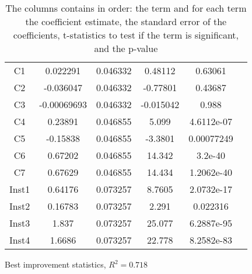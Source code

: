\documentclass[../main.tex]{subfiles}
\begin{document}
\begin{table}
\begin{adjustbox}{width=\columnwidth,center}
\begin{subtable}{.75\columnwidth}
\begin{tabular}{cccccc}
            C1      & 0.022291  & 0.046332      & 0.48112   & 0.63061   \\
            C2      & -0.036047 & 0.046332      & -0.77801  & 0.43687   \\
            C3      &-0.00069693& 0.046332      & -0.015042 & 0.988     \\
            C4      & 0.23891   & 0.046855      & 5.099     & 4.6112e-07\\
            C5      & -0.15838  & 0.046855      & -3.3801   & 0.00077249\\
            C6      & 0.67202   & 0.046855      & 14.342    & 3.2e-40   \\
            C7      & 0.67629   & 0.046855      & 14.434    & 1.2062e-40\\
            Inst1   & 0.64176   & 0.073257      & 8.7605    & 2.0732e-17\\
            Inst2   & 0.16783   & 0.073257      & 2.291     & 0.022316  \\
            Inst3   & 1.837     & 0.073257      & 25.077    & 6.2887e-95\\
            Inst4   & 1.6686    & 0.073257      & 22.778    & 8.2582e-83\\
            \hline
            \end{tabular}
        \caption{Best improvement statistics, $R^2=0.718$}
        \label{tab:regrBestNormal}
        \end{subtable}
    \end{adjustbox}
    \label{tab:regrNormal}
    \caption*{The columns contains in order: the term and for each term the coefficient estimate, the standard error of the coefficients, t-statistics to test if the term is significant, and the p-value}
\end{table}
\end{document}
